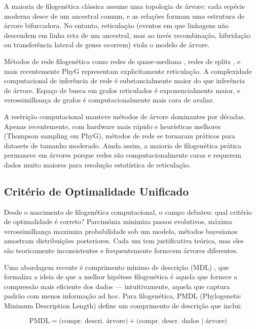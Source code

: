A maioria de filogenética clássica assume uma topologia de árvore: cada espécie moderna desce de um ancestral comum, e as relações formam uma estrutura de árvore bifurcadora. No entanto, reticulação (eventos em que linhagens não descendem em linha reta de um ancestral, mas ao invés recombinação, hibridação ou transferência lateral de genes ocorrem) viola o modelo de árvore.

Métodos de rede filogenética como redes de quase-mediana \parencite{holland2004}, redes de splits \parencite{bryant2004}, e mais recentemente PhyG \parencite{wheeler2024a} representam explicitamente reticulação. A complexidade computacional de inferência de rede é substancialmente maior do que inferência de árvore. Espaço de busca em grafos reticulados é exponencialmente maior, e verossimilhança de grafos é computacionalmente mais cara de avaliar.

A restrição computacional manteve métodos de árvore dominantes por décadas. Apenas recentemente, com hardware mais rápido e heurísticas melhores (Thompson sampling em PhyG), métodos de rede se tornaram práticos para datasets de tamanho moderado. Ainda assim, a maioria de filogenética prática permanece em árvores porque redes são computacionalmente caras e requerem dados muito maiores para resolução estatística de reticulação.

\subsection{Critério de Optimalidade Unificado}

Desde o nascimento de filogenética computacional, o campo debateu: qual critério de optimalidade é correto? Parcimônia minimiza passos evolutivos, máxima verossimilhança maximiza probabilidade sob um modelo, métodos bayesianos amostram distribuições posteriores. Cada um tem justificativa teórica, mas eles são teoricamente inconsistentes e frequentemente fornecem árvores diferentes.

Uma abordagem recente é comprimento mínimo de descrição (MDL) \parencite{wheeler2025}, que formaliza a ideia de que a melhor hipótese filogenética é aquela que fornece a compressão mais eficiente dos dados --- intuitivamente, aquela que captura padrão com menos informação ad hoc. Para filogenética, PMDL (Phylogenetic Minimum Description Length) \parencite{wheeler2025} define um comprimento de descrição que inclui:

\begin{equation}
\text{PMDL} = \text{(compr. descri. árvore)} + \text{(compr. descr. dados | árvore)}
\end{equation}

